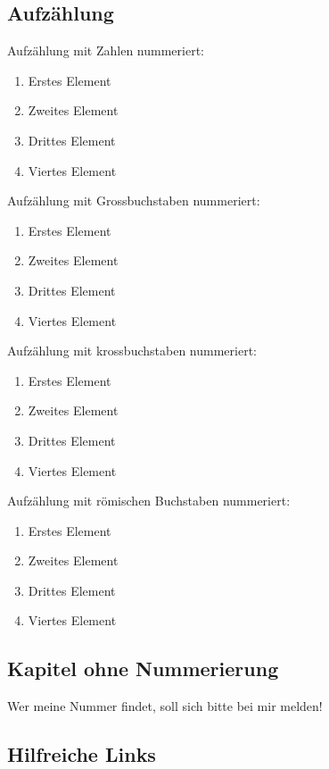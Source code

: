 \subsection{Aufzählung}

Aufzählung mit Zahlen nummeriert:
\begin{enumerate}
	\item Erstes Element
	\item Zweites Element
	\item Drittes Element
	\item Viertes Element
\end{enumerate}

Aufzählung mit Grossbuchstaben nummeriert:
\begin{enumerate}[label=\Alph*]
	\item Erstes Element
	\item Zweites Element
	\item Drittes Element
	\item Viertes Element
\end{enumerate}

Aufzählung mit krossbuchstaben nummeriert:
\begin{enumerate}[label=\alph*)]
	\item Erstes Element
	\item Zweites Element
	\item Drittes Element
	\item Viertes Element
\end{enumerate}

Aufzählung mit römischen Buchstaben nummeriert:
\begin{enumerate}[label=(\roman*)]
	\item Erstes Element
	\item Zweites Element
	\item Drittes Element
	\item Viertes Element
\end{enumerate}

\subsection*{Kapitel ohne Nummerierung}

Wer meine Nummer findet, soll sich bitte bei mir melden!

\subsection{Hilfreiche Links}

